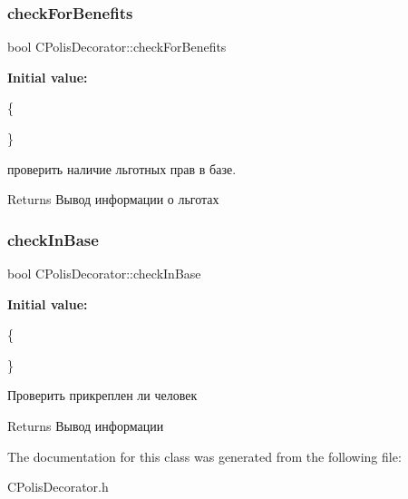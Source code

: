 \subsubsection{\texorpdfstring{check\+For\+Benefits}{checkForBenefits}}
{\footnotesize\ttfamily bool C\+Polis\+Decorator\+::check\+For\+Benefits}

{\bfseries Initial value\+:}
\begin{DoxyCode}
\{
            
    \}
\end{DoxyCode}


проверить наличие льготных прав в базе. 

\begin{DoxyReturn}{Returns}
Вывод информации о льготах 
\end{DoxyReturn}
\mbox{\label{classCPolisDecorator_adc7849b17854791c53ae1b18a7b445c6}} 
\subsubsection{\texorpdfstring{check\+In\+Base}{checkInBase}}
{\footnotesize\ttfamily bool C\+Polis\+Decorator\+::check\+In\+Base}

{\bfseries Initial value\+:}
\begin{DoxyCode}
\{
            
    \}
\end{DoxyCode}


Проверить прикреплен ли человек 

\begin{DoxyReturn}{Returns}
Вывод информации 
\end{DoxyReturn}


The documentation for this class was generated from the following file\+:\begin{DoxyCompactItemize}
\item 
C\+Polis\+Decorator.\+h\end{DoxyCompactItemize}
